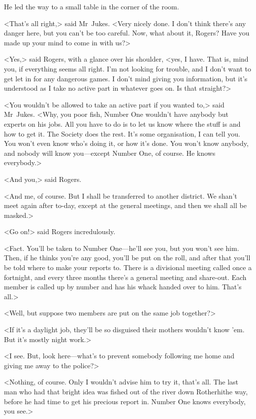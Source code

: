 He led the way to a small table in the corner of the room.

<That's all right,> said Mr~Jukes. <Very nicely done. I don't think there's any danger here, but you can't be too careful. Now, what about it, Rogers? Have you made up your mind to come in with us?>

<Yes,> said Rogers, with a glance over his shoulder, <yes, I have. That is, mind you, if everything seems all right. I'm not looking for trouble, and I don't want to get let in for any dangerous games. I don't mind giving you information, but it's understood as I take no active part in whatever goes on. Is that straight?>

<You wouldn't be allowed to take an active part if you wanted to,> said Mr~Jukes. <Why, you poor fish, Number One wouldn't have anybody but experts on his jobs. All you have to do is to let us know where the stuff is and how to get it. The Society does the rest. It's some organisation, I can tell you. You won't even know who's doing it, or how it's done. You won't know anybody, and nobody will know you—except Number One, of course. He knows everybody.>

<And you,> said Rogers.

<And me, of course. But I shall be transferred to another district. We shan't meet again after to-day, except at the general meetings, and then we shall all be masked.>

<Go on!> said Rogers incredulously.

<Fact. You'll be taken to Number One—he'll see you, but you won't see him. Then, if he thinks you're any good, you'll be put on the roll, and after that you'll be told where to make your reports to. There is a divisional meeting called once a fortnight, and every three months there's a general meeting and share-out. Each member is called up by number and has his whack handed over to him. That's all.>

<Well, but suppose two members are put on the same job together?>

<If it's a daylight job, they'll be so disguised their mothers wouldn't know 'em. But it's mostly night work.>

<I see. But, look here—what's to prevent somebody following me home and giving me away to the police?>

<Nothing, of course. Only I wouldn't advise him to try it, that's all. The last man who had that bright idea was fished out of the river down Rotherhithe way, before he had time to get his precious report in. Number One knows everybody, you see.>

